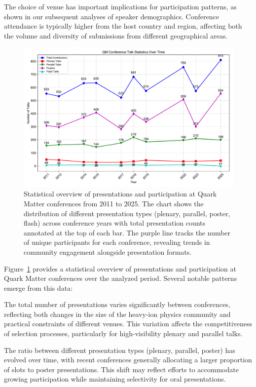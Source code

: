 \documentclass[a4paper,11pt]{article}
\begin{document}
The choice of venue has important implications for participation patterns, as shown in our subsequent analyses of speaker demographics. Conference attendance is typically higher from the host country and region, affecting both the volume and diversity of submissions from different geographical areas.

\begin{figure}[H]
\centering
\includegraphics[width=\textwidth]{figures/QM_talk_statistics.pdf}
\caption{Statistical overview of presentations and participation at Quark Matter conferences from 2011 to 2025. The chart shows the distribution of different presentation types (plenary, parallel, poster, flash) across conference years with total presentation counts annotated at the top of each bar. The purple line tracks the number of unique participants for each conference, revealing trends in community engagement alongside presentation formats.}
\label{fig:talk_statistics}
\end{figure}

Figure~\ref{fig:talk_statistics} provides a statistical overview of presentations and participation at Quark Matter conferences over the analyzed period. Several notable patterns emerge from this data:

The total number of presentations varies significantly between conferences, reflecting both changes in the size of the heavy-ion physics community and practical constraints of different venues. This variation affects the competitiveness of selection processes, particularly for high-visibility plenary and parallel talks.

The ratio between different presentation types (plenary, parallel, poster) has evolved over time, with recent conferences generally allocating a larger proportion of slots to poster presentations. This shift may reflect efforts to accommodate growing participation while maintaining selectivity for oral presentations.
\end{document}
